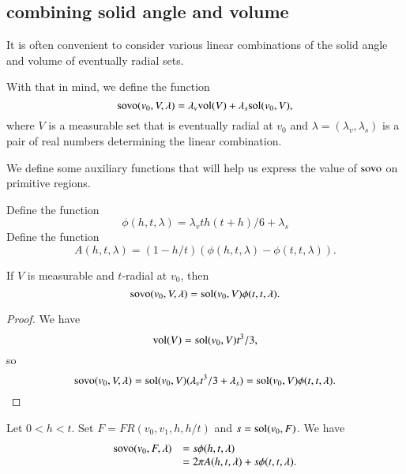 \subsection{combining solid angle and volume}

It is often convenient to consider various linear combinations
of the solid angle and volume of eventually radial sets.  

\begin{definition}\label{def:sovo}
With
that in mind, we define the function
  $$
  {\operatorname{sovo}}(v_0,V,\lambda) = \lambda_v {\operatorname{vol}}(V) + \lambda_s
  {\operatorname{sol}}(v_0,V),
  $$
where $V$ is a measurable set that is eventually radial at $v_0$
and $\lambda=(\lambda_v,\lambda_s)$ is a pair of real numbers
determining the linear combination.
\end{definition}

We define some auxiliary functions that will help us express
the value of ${\operatorname{sovo}}$ on primitive regions.

\begin{definition}
Define the function
 $$
 \phi(h,t,\lambda)=
   \lambda_v  t h (t+h)/6 + \lambda_s 
 $$
Define the function
 $$A(h,t,\lambda) = (1-h/t) (\phi(h,t,\lambda) - \phi(t,t,\lambda)).$$
\end{definition}

\begin{lemma} If $V$ is measurable and $t$-radial at $v_0$,
then $${\operatorname{sovo}}(v_0,V,\lambda) = {\operatorname{sol}}(v_0,V)\phi(t,t,\lambda).$$
\end{lemma}

\begin{proof} We have $${\operatorname{vol}}(V) = {\operatorname{sol}}(v_0,V)t^3/3,$$
so $${\operatorname{sovo}}(v_0,V,\lambda) = 
  {\operatorname{sol}}(v_0,V)(\lambda_v t^3/3 + \lambda_s) = 
   {\operatorname{sol}}(v_0,V)\phi(t,t,\lambda).$$
\end{proof}

\begin{lemma} Let $0 < h < t$.
Set $F  = FR(v_0,v_1,h,h/t)$ and $s = \operatorname{sol}(v_0,F)$.
  We have
  $$
  \begin{array}{lll}
  {\operatorname{sovo}}(v_0,F,\lambda) 
   &= s
  \phi(h,t,\lambda) \\
   &= 2\pi A(h,t,\lambda) + s\phi(t,t,\lambda).
  \end{array}
  $$
\end{lemma}

